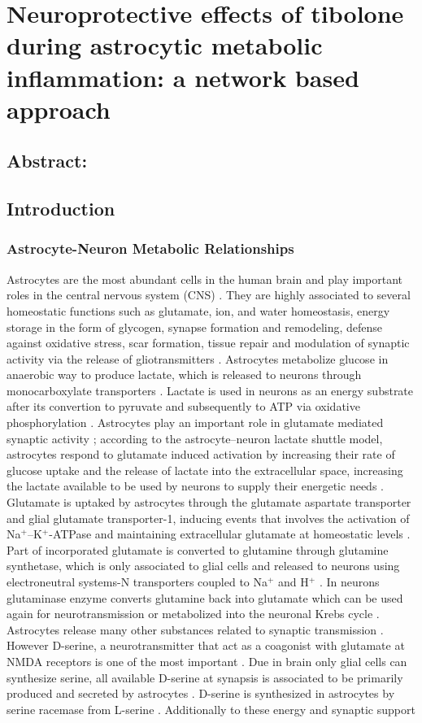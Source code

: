 \chapter{Neuroprotective effects of tibolone during astrocytic metabolic inflammation: a network based approach}
\section*{Abstract:}
\section{Introduction}
\subsection*{Astrocyte-Neuron Metabolic Relationships}
Astrocytes are the most abundant cells in the human brain and play important roles in the central nervous system (CNS) \cite{Takuma2004}. They are highly associated to several homeostatic functions such as glutamate, ion, and water homeostasis, energy storage in the form of glycogen, synapse formation and remodeling, defense against oxidative stress, scar formation, tissue repair and modulation of synaptic activity via the release of gliotransmitters \cite{Lange2012}. Astrocytes metabolize glucose in anaerobic way to produce lactate, which is released to neurons through monocarboxylate transporters \cite{Kimelberg2010}. Lactate is used in neurons as an energy substrate after its convertion to pyruvate and subsequently to ATP via oxidative phosphorylation \cite{Allen2009}. Astrocytes play an important role in glutamate mediated synaptic activity \cite{Halassa2010}; according to the astrocyte–neuron lactate shuttle model, astrocytes respond to glutamate induced activation by increasing their rate of glucose uptake and the release of lactate into the extracellular space, increasing the lactate available to be used by neurons to supply their energetic needs \cite{Giaume2010}. Glutamate is uptaked by astrocytes through the glutamate aspartate transporter and glial glutamate transporter-1, inducing events that involves the activation of Na$^+$–K$^+$-ATPase and maintaining extracellular glutamate at homeostatic levels \cite{Nijboer2013}. Part of incorporated glutamate is converted to glutamine through glutamine synthetase, which is only associated to glial cells and released to neurons using electroneutral systems-N transporters coupled to Na$^+$ and H$^+$ \cite{Barres2008}. In neurons glutaminase enzyme converts glutamine back into glutamate which can be used again for neurotransmission or metabolized into the neuronal Krebs cycle \cite{Shen2013}. Astrocytes release many other substances related to synaptic transmission \cite{Petrelli2016}. However D-serine, a neurotransmitter that act as a coagonist with glutamate at NMDA receptors is one of the most important \cite{Halassa2010}. Due in brain only glial cells can synthesize serine, all available D-serine at synapsis is associated to be primarily produced and secreted by astrocytes \cite{Barres2008}. D-serine is synthesized in astrocytes by serine racemase from L-serine \cite{Durrant2014}. Additionally to these energy and synaptic support 